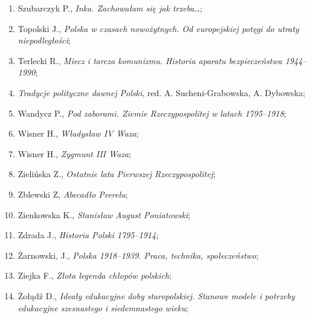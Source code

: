 \documentclass[a4paper,11pt]{article}
\begin{document}
\begin{enumerate}
\item Szubarczyk P., \textit{Inka. Zachowałam się jak trzeba\ldots};



\item Topolski J., \textit{Polska w czasach nowożytnych. Od europejskiej
    potęgi do utraty niepodległości};



\item Terlecki R., \textit{Miecz i tarcza komunizmu. Historia aparatu
    bezpieczeństwa 1944--1990};



\item \textit{Tradycje polityczne dawnej Polski}, red. A.
  Sucheni-Grabowska, A. Dybowska;



\item Wandycz P., \textit{Pod zaborami. Ziemie Rzeczypospolitej w latach
    1795--1918};



\item Wisner H., \textit{Władysław IV Waza};



\item Wisner H., \textit{Zygmunt III Waza};



\item Zielińska Z., \textit{Ostatnie lata Pierwszej Rzeczypospolitej};



\item Zblewski Z, \textit{Abecadło Peerelu};



\item Zienkowska K., \textit{Stanisław August Poniatowski};



\item Zdrada J., \textit{Historia Polski 1795--1914};



\item Żarnowski, J., \textit{Polska 1918--1939. Praca, technika,
    społeczeństwo};



\item Ziejka F., \textit{Złota legenda chłopów polskich};



\item Żołądź D., \textit{Ideały edukacyjne doby staropolskiej. Stanowe
    modele i potrzeby edukacyjne szesnastego i siedemnastego wieku};




\end{enumerate}
\end{document}
